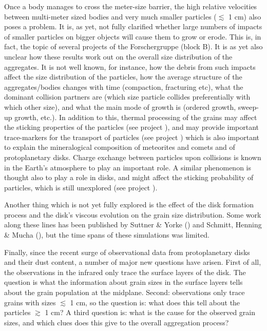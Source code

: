 Once a body manages to cross the meter-size barrier, the high relative
velocities between multi-meter sized bodies and very much smaller particles
($\lesssim$ 1 cm) also poses a problem. It is, as yet, not fully clarified
whether large numbers of impacts of smaller particles on bigger objects will
cause them to grow or erode. This is, in fact, the topic of several projects
of the Forschergruppe (block B). 
%
%
It is as yet also unclear how these results work out on the overall size
distribution of the aggregates. It is not well known, for instance, how the
debris from such impacts affect the size distribution of the particles, how
the average structure of the aggregates/bodies changes with time
(compaction, fracturing etc), what the dominant collision partners are
(which size particle collides preferentially with which other size), and
what the main mode of growth is (ordered growth, sweep-up growth, etc.). In
addition to this, thermal processing of the grains may affect the sticking
properties of the particles (see project \projblumtrie{}), and may provide
important trace-markers for the transport of particles (see project
\projtscharn{}) which is also important to explain the mineralogical
composition of meteorites and comets and of protoplanetary disks. Charge
exchange between particles upon collisions is known in the Earth's
atmosphere to play an important role. A similar phenomenon is thought also
to play a role in disks, and might affect the sticking probability of
particles, which is still unexplored (see project \projblum{}). 

Another thing which is not yet fully explored is the effect of the disk
formation process and the disk's viscous evolution on the grain size
distribution. Some work along these lines has been published by Suttner \&
Yorke () and Schmitt, Henning \& Mucha (), but the time
spans of these simulations was limited.

Finally, since the recent surge of observational data from protoplanetary
disks and their dust content, a number of major new questions have arisen.
First of all, the observations in the infrared only trace the surface 
layers of the disk. The question is what the information about grain sizes
in the surface layers tells about the grain population at the midplane.
Second: observations only trace grains with sizes $\lesssim$ 1 cm, so the
question is: what does this tell about the particles $\gtrsim$ 1 cm? A third
question is: what is the cause for the observed grain sizes, and which clues
does this give to the overall aggregation process?

